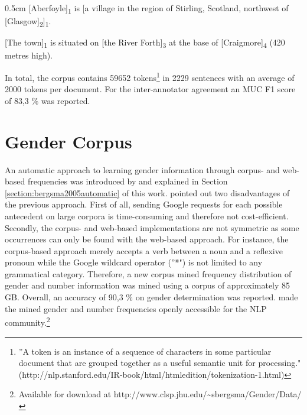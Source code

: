 \begin{addmargin}[0.5cm]{0.5cm}
[Aberfoyle]\textsubscript{1} is [a village in the region of Stirling, Scotland, northwest of [Glasgow]\textsubscript{2}]\textsubscript{1}.

[The town]\textsubscript{1} is situated on [the River Forth]\textsubscript{3} at the base of [Craigmore]\textsubscript{4} (420 metres high).
\end{addmargin}

In total, the corpus contains 59652 tokens\footnote{''A token is an instance of a sequence of characters in some particular document that are grouped together as a useful semantic unit for processing." (http://nlp.stanford.edu/IR-book/html/htmledition/tokenization-1.html)} in 2229 sentences with an average of 2000 tokens per document. For the inter-annotator agreement an MUC F1 score \citep{vilain1995model} of 83,3 \% was reported.

\section{Gender Corpus}
\label{section:gendercorpus}
An automatic approach to learning gender information through corpus- and web-based frequencies was introduced by \cite{bergsma2005automatic} and explained in Section \ref{section:bergsma2005automatic} of this work. 
\cite{Bergsma:06} pointed out two disadvantages of the previous approach. First of all, sending Google requests for each possible antecedent on large corpora is time-consuming and therefore not cost-efficient. Secondly, the corpus- and web-based implementations are not symmetric as some occurrences can only be found with the web-based approach. For instance, the corpus-based approach merely accepts a verb between a noun and a reflexive pronoun while the Google wildcard operator (''*") is not limited to any grammatical category.
Therefore, a new corpus mined frequency distribution of gender and number information was mined using a corpus of approximately 85 GB. Overall, an accuracy of 90,3 \% on gender determination was reported. \cite{Bergsma:06} made the mined gender and number frequencies openly accessible for the NLP community.\footnote{Available for download at http://www.clsp.jhu.edu/\textasciitilde sbergsma/Gender/Data/}